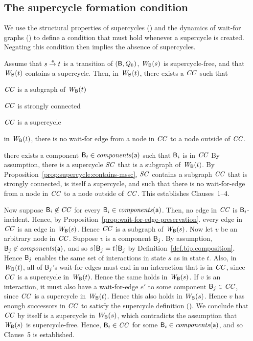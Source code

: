 \subsection{The supercycle formation condition}

We use the structural properties of supercycles () and the 
dynamics of wait-for graphs () to define a condition that 
must hold whenever a supercycle is created. Negating this condition then implies the absence of
supercycles. 


 \label{prop:supercycle-formation}
Assume that $s \goesto[\act] t$ is a transition of $(\B, Q_0)$, $\wfg{\B}{s}$ is supercycle-free, and that $\wfg{\B}{t}$
contains a supercycle.  Then, in $\wfg{\B}{t}$, there exists a $\CC$ such that
\bn
\item $\CC$ is a subgraph of $\wfg{\B}{t}$
\item $\CC$ is strongly connected
\item $\CC$ is a supercycle
\item  in $\wfg{\B}{t}$, there is no wait-for edge from a node in $\CC$ to a node outside of $\CC$.
\item there exists a component $\B_i \in \cmps{\act}$ such that $\B_i$ is in $\CC$
\en
\ep
%
\bpr
By assumption, there is a supercycle $\SC$ that is a subgraph of $\wfg{\B}{t}$.
By Proposition~\ref{prop:supercycle:contains-mssc}, $\SC$ contains a
subgraph $\CC$ that is strongly connected, is itself a supercycle, and
such that there is no wait-for-edge from a node in $\CC$ to a node outside of $\CC$.
This establishes Clauses~1--4.

Now suppose $\B_i \not\in \CC$ for every $\B_i \in \cmps{\act}$. Then, no edge in $\CC$ is
$\B_i$-incident.  Hence, by Proposition~\ref{prop:wait-for-edge-preservation}, every edge in $\CC$
is an edge in $\wfg{\B}{s}$. Hence $\CC$ is a subgraph of $\wfg{\B}{s}$.
%
Now let $v$ be an arbitrary node in $\CC$.
%
Suppose $v$ is a component $\B_j$.  By assumption, $\B_j \not\in \cmps{\act}$, and so
$s \pj \B_j = t \pj \B_j$ by Definition~\ref{def.bip.composition}. Hence $\B_j$ enables the same set
of interactions in state $s$ as in state $t$. Also, in $\wfg{\B}{t}$, all of $\B_j$'s wait-for edges
must end in an interaction that is in $\CC$, since $\CC$ is a supercycle in $\wfg{\B}{t}$. Hence the
same holds in $\wfg{\B}{s}$.
%
If $v$ is an interaction, it must also have a wait-for-edge $e'$ to some component $\B_j \in \CC$,
since $\CC$ is a supercycle in $\wfg{\B}{t}$. Hence this also holds in $\wfg{\B}{s}$.
%
Hence $v$ has enough successors in $\CC$ to satisfy the supercycle definition ().
%
We conclude that $\CC$ by itself is a supercycle in $\wfg{\B}{s}$, which contradicts the assumption
that $\wfg{\B}{s}$ is supercycle-free. Hence, $\B_i \in \CC$ for some $\B_i \in \cmps{\act}$, and so
Clause~5 is established.  
\epr



